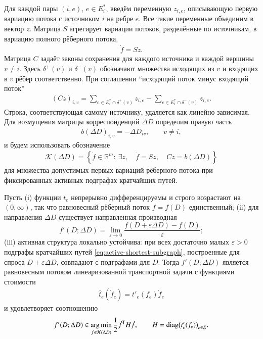 \documentclass{crm-article}
\begin{document}
Для каждой пары $(i,e)$, $e\in E_i^*$, введём переменную $z_{i,e}$,
описывающую первую вариацию потока с источником $i$ на ребре $e$. Все такие
переменные объединим в вектор $z$. Матрица $S$ агрегирует вариации потоков,
разделённые по источникам, в вариацию полного рёберного потока,
\begin{gather}
 \dot f=Sz.
 \label{eq:variation-aggregation}
\end{gather}
Матрица $C$ задаёт законы сохранения для каждого источника и каждой вершины
$v\ne i$. Здесь $\delta^+(v)$ и $\delta^-(v)$ обозначают множества исходящих
из $v$ и входящих в $v$ рёбер соответственно. При соглашении ``исходящий
поток минус входящий поток''
\begin{gather}
 (Cz)_{i,v}=
 \sum_{e\in E_i^*\cap\delta^+(v)}z_{i,e}
 -\sum_{e\in E_i^*\cap\delta^-(v)}z_{i,e}.
 \label{eq:variation-balance}
\end{gather}
Строка, соответствующая самому источнику, удаляется как линейно зависимая.
Для возмущения матрицы корреспонденций $\Delta D$ определим правую часть
\begin{gather}
 b(\Delta D)_{i,v}=-\Delta D_{iv},\qquad v\ne i,
 \label{eq:variation-rhs}
\end{gather}
и будем использовать обозначение
\begin{gather}
 \mathcal K(\Delta D)=
 \left\{\dot f\in\mathbb R^m:\ \exists z,\quad
       \dot f=Sz,\quad Cz=b(\Delta D)\right\}
 \label{eq:variation-set}
\end{gather}
для множества допустимых первых вариаций рёберного потока при фиксированных
активных подграфах кратчайших путей.

\begin{pro}
\label{pro:sensitivity}
Пусть {\rm(i)} функции $t_e$ непрерывно дифференцируемы и строго возрастают
на $(0,\infty)$, так что равновесный рёберный поток $f=f(D)$ единственный;
{\rm(ii)} для направления $\Delta D$ существует направленная производная
\[
 f'(D;\Delta D)=\lim\limits_{\varepsilon\rightarrow0}
 \frac{f(D+\varepsilon\Delta D)-f(D)}{\varepsilon};
\]
{\rm(iii)} активная структура локально устойчива: при всех достаточно малых
$\varepsilon>0$ подграфы кратчайших путей
\eqref{eq:active-shortest-subgraph}, построенные для спроса
$D+\varepsilon\Delta D$, совпадают с подграфами для $D$. Тогда
$f'(D;\Delta D)$ является равновесным потоком линеаризованной транспортной
задачи с функциями стоимости
\begin{gather}
 \widehat t_e(\dot f_e)=t'_e(f_e)\dot f_e
 \label{eq:linearized-cost}
\end{gather}
и удовлетворяет соотношению
\begin{gather}
 f'(D;\Delta D)\in
 \mathop{\rm arg\,min}\limits_{\dot f\in\mathcal K(\Delta D)}
 \frac12\dot f^{\mathsf T}H\dot f,
 \qquad
 H=\mathop{\rm diag}\bigl(t'_e(f_e)\bigr)_{e\in E}.
 \label{eq:linearized-sensitivity}
\end{gather}
\end{pro}
\end{document}
